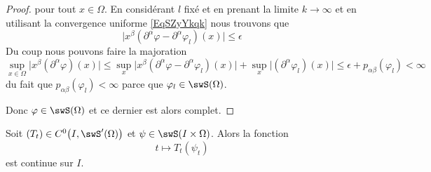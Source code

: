 \begin{proof}
	pour tout \( x\in\Omega\). En considérant \( l\) fixé et en prenant la limite \( k\to \infty\) et en utilisant la convergence uniforme \eqref{EqSZyYkqk} nous trouvons que
	\begin{equation}
		\big| x^{\beta}(\partial^{\alpha}\varphi-\partial^{\alpha}\varphi_l)(x) \big|\leq \epsilon
	\end{equation}
	Du coup nous pouvons faire la majoration
	\begin{equation}
		\sup_{x\in\Omega}\big| x^{\beta}(\partial^{\alpha}\varphi)(x) \big|\leq\sup_x\big| x^{\beta}(\partial^{\alpha}\varphi-\partial^{\alpha}\varphi_l)(x) \big|+\sup_x\big| (\partial^{\alpha}\varphi_l)(x) \big|\leq\epsilon+p_{\alpha\beta}(\varphi_l)<\infty
	\end{equation}
	du fait que \( p_{\alpha\beta}(\varphi_l)<\infty\) parce que \( \varphi_l\in\swS(\Omega)\).

	Donc \( \varphi\in\swS(\Omega)\) et ce dernier est alors complet.
\end{proof}

\begin{proposition}
	Soit \( (T_t)\in C^0\big( I,\swS'(\Omega) \big)\) et \( \psi\in\swS(I\times \Omega)\). Alors la fonction
	\begin{equation}    \label{EqULcaYjm}
		t\mapsto T_t(\psi_t)
	\end{equation}
	est continue sur \( I\).
\end{proposition}

